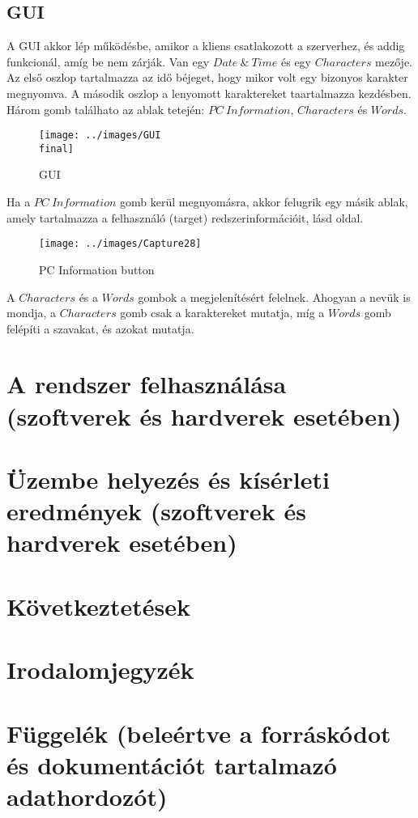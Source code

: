 \documentclass[a4paper, 11pt]{article}
\begin{document}
\subsection{GUI}\label{subsec:gui}
A GUI akkor lép működésbe, amikor a kliens csatlakozott a szerverhez, és addig funkcionál, amíg be nem zárják. Van egy $Date\ \&\ Time$ és egy $Characters$ mezője. Az első oszlop tartalmazza az idő béjeget, hogy mikor volt egy bizonyos karakter megnyomva. A második oszlop a lenyomott karaktereket taartalmazza kezdésben. Három gomb találhato az ablak tetején: $PC\ Information$, $Characters$ és $Words$.
\begin{figure}[H]
\centering
\texttt{[image: ../images/GUI\\ final]}
\caption{GUI}
\label{fig:gui}
\end{figure}
Ha a $PC\ Information$ gomb kerül megnyomásra, akkor felugrik egy másik ablak, amely tartalmazza a felhasználó (target) redszerinformációit, lásd \pageref{subsubsec:keyloggerclientclass} oldal.
\begin{figure}[H]
\centering
\texttt{[image: ../images/Capture28]}
\caption{PC Information button}
\label{fig:pcinfo}
\end{figure}
A $Characters$ és a $Words$ gombok a megjelenítésért felelnek. Ahogyan a nevük is mondja, a $Characters$ gomb csak a karaktereket mutatja, míg a $Words$ gomb felépíti a szavakat, és azokat mutatja. 

\section{A rendszer felhasználása (szoftverek és hardverek esetében)}\label{sec:useage}

\section{Üzembe helyezés és kísérleti eredmények (szoftverek és hardverek esetében)}\label{sec:testcases}

\section{Következtetések}\label{sec:conc}

\section{Irodalomjegyzék}\label{sec:irod}

\section{Függelék (beleértve a forráskódot és dokumentációt tartalmazó adathordozót)}\label{sec:dep}
\end{document}
